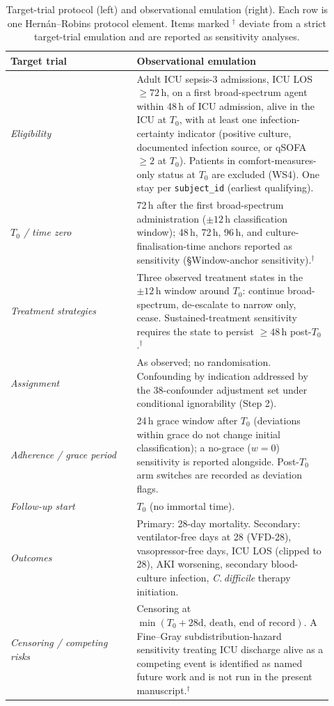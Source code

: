 \documentclass[11pt,a4paper]{article}
\begin{document}
\begin{table}[H]
  \centering
  \small
  \caption{Target-trial protocol (left) and observational emulation (right). Each row is one Hernán--Robins protocol element. Items marked $^\dagger$ deviate from a strict target-trial emulation and are reported as sensitivity analyses.}
  \label{tab:protocol}
  \begin{tabular}{p{0.36\linewidth}p{0.56\linewidth}}
    \toprule
    Target trial & Observational emulation \\
    \midrule
    \emph{Eligibility} & Adult ICU sepsis-3 admissions, ICU LOS $\geq 72$\,h, on a first broad-spectrum agent within 48\,h of ICU admission, alive in the ICU at $T_0$, with at least one infection-certainty indicator (positive culture, documented infection source, or qSOFA $\geq 2$ at $T_0$). Patients in comfort-measures-only status at $T_0$ are excluded (WS4). One stay per \texttt{subject\_id} (earliest qualifying). \\
    \emph{$T_0$ / time zero} & 72\,h after the first broad-spectrum administration ($\pm 12$\,h classification window); 48\,h, 72\,h, 96\,h, and culture-finalisation-time anchors reported as sensitivity (\S Window-anchor sensitivity).$^\dagger$ \\
    \emph{Treatment strategies} & Three observed treatment states in the $\pm 12$\,h window around $T_0$: continue broad-spectrum, de-escalate to narrow only, cease. Sustained-treatment sensitivity requires the state to persist $\geq 48$\,h post-$T_0$.$^\dagger$ \\
    \emph{Assignment} & As observed; no randomisation. Confounding by indication addressed by the 38-confounder adjustment set under conditional ignorability (Step 2). \\
    \emph{Adherence / grace period} & 24\,h grace window after $T_0$ (deviations within grace do not change initial classification); a no-grace ($w=0$) sensitivity is reported alongside. Post-$T_0$ arm switches are recorded as deviation flags. \\
    \emph{Follow-up start} & $T_0$ (no immortal time). \\
    \emph{Outcomes} & Primary: 28-day mortality. Secondary: ventilator-free days at 28 (VFD-28), vasopressor-free days, ICU LOS (clipped to 28), AKI worsening, secondary blood-culture infection, \emph{C.\,difficile} therapy initiation. \\
    \emph{Censoring / competing risks} & Censoring at $\min(T_0 + 28\text{d},\,\text{death},\,\text{end of record})$. A Fine--Gray subdistribution-hazard sensitivity treating ICU discharge alive as a competing event is identified as named future work and is not run in the present manuscript.$^\dagger$ \\

\end{tabular}
\end{table}
\end{document}
